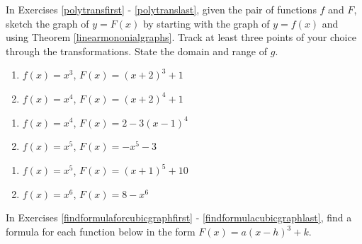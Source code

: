 In Exercises \ref{polytransfirst} - \ref{polytranslast}, given the pair of functions $f$ and $F$, sketch the graph of $y=F(x)$ by starting with the graph of $y = f(x)$ and using Theorem \ref{linearmononialgraphs}.  Track at least three points of your choice through the transformations. State the domain and range of $g$.

\begin{multicols}{2}
\begin{enumerate}


\item $f(x) = x^3$,  $F(x) = (x + 2)^{3} + 1$ \label{polytransfirst}
\item $f(x) = x^4$, $F(x) = (x + 2)^{4} + 1$

\setcounter{HW}{\value{enumi}}
\end{enumerate}
\end{multicols}

\begin{multicols}{2}
\begin{enumerate}
\setcounter{enumi}{\value{HW}}

\item $f(x) = x^4$, $F(x) = 2 - 3(x - 1)^{4}$
\item $f(x) = x^5$, $F(x) = -x^{5} - 3$

\setcounter{HW}{\value{enumi}}
\end{enumerate}
\end{multicols}

\begin{multicols}{2}
\begin{enumerate}
\setcounter{enumi}{\value{HW}}

\item $f(x) = x^5$, $F(x) = (x+1)^5+10$
\item $f(x) = x^6$, $F(x) = 8-x^6$ \label{polytranslast}

\setcounter{HW}{\value{enumi}}
\end{enumerate}
\end{multicols}


In Exercises \ref{findformulaforcubicgraphfirst} - \ref{findformulacubicgraphlast}, find a formula for each function below in the form $F(x) = a(x-h)^3+k$.

